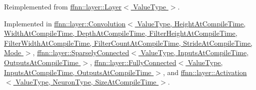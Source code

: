 Reimplemented from \hyperlink{classffnn_1_1layer_1_1_layer_ad5dc8961ffb0446f31952adc1da62746}{ffnn\-::layer\-::\-Layer$<$ Value\-Type $>$}.



Implemented in \hyperlink{classffnn_1_1layer_1_1_convolution_af079973fdb795f4ccd902a00c4d96d3b}{ffnn\-::layer\-::\-Convolution$<$ Value\-Type, Height\-At\-Compile\-Time, Width\-At\-Compile\-Time, Depth\-At\-Compile\-Time, Filter\-Height\-At\-Compile\-Time, Filter\-Width\-At\-Compile\-Time, Filter\-Count\-At\-Compile\-Time, Stride\-At\-Compile\-Time, Mode $>$}, \hyperlink{classffnn_1_1layer_1_1_sparsely_connected_a597ea83c83e8f4f64a1fb7f17a1ea015}{ffnn\-::layer\-::\-Sparsely\-Connected$<$ Value\-Type, Inputs\-At\-Compile\-Time, Outputs\-At\-Compile\-Time $>$}, \hyperlink{classffnn_1_1layer_1_1_fully_connected_afd5c1a006cf33a47cb7e2a982fe4cd6d}{ffnn\-::layer\-::\-Fully\-Connected$<$ Value\-Type, Inputs\-At\-Compile\-Time, Outputs\-At\-Compile\-Time $>$}, and \hyperlink{classffnn_1_1layer_1_1_activation_a3c4284245343f2132dd28eaf7ffbed47}{ffnn\-::layer\-::\-Activation$<$ Value\-Type, Neuron\-Type, Size\-At\-Compile\-Time $>$}.

